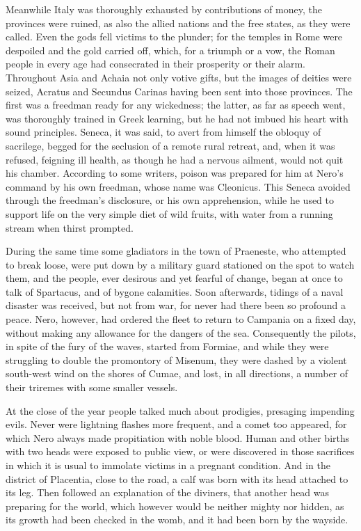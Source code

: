 Meanwhile Italy was thoroughly exhausted by contributions of money, the provinces were ruined, as also the allied nations and the free states, as they were called. Even the gods fell victims to the plunder; for the temples in Rome were despoiled and the gold carried off, which, for a triumph or a vow, the Roman people in every age had consecrated in their prosperity or their alarm. Throughout Asia and Achaia not only votive gifts, but the images of deities were seized, Acratus and Secundus Carinas having been sent into those provinces. The first was a freedman ready for any wickedness; the latter, as far as speech went, was thoroughly trained in Greek learning, but he had not imbued his heart with sound principles. Seneca, it was said, to avert from himself the obloquy of sacrilege, begged for the seclusion of a remote rural retreat, and, when it was refused, feigning ill health, as though he had a nervous ailment, would not quit his chamber. According to some writers, poison was prepared for him at Nero's command by his own freedman, whose name was Cleonicus. This Seneca avoided through the freedman's disclosure, or his own apprehension, while he used to support life on the very simple diet of wild fruits, with water from a running stream when thirst prompted.


During the same time some gladiators in the town of Praeneste, who attempted to break loose, were put down by a military guard stationed on the spot to watch them, and the people, ever desirous and yet fearful of change, began at once to talk of Spartacus, and of bygone calamities. Soon afterwards, tidings of a naval disaster was received, but not from war, for never had there been so profound a peace. Nero, however, had ordered the fleet to return to Campania on a fixed day, without making any allowance for the dangers of the sea. Consequently the pilots, in spite of the fury of the waves, started from Formiae, and while they were struggling to double the promontory of Misenum, they were dashed by a violent south-west wind on the shores of Cumae, and lost, in all directions, a number of their triremes with some smaller vessels.


At the close of the year people talked much about prodigies, presaging impending evils. Never were lightning flashes more frequent, and a comet too appeared, for which Nero always made propitiation with noble blood. Human and other births with two heads were exposed to public view, or were discovered in those sacrifices in which it is usual to immolate victims in a pregnant condition. And in the district of Placentia, close to the road, a calf was born with its head attached to its leg. Then followed an explanation of the diviners, that another head was preparing for the world, which however would be neither mighty nor hidden, as its growth had been checked in the womb, and it had been born by the wayside.

